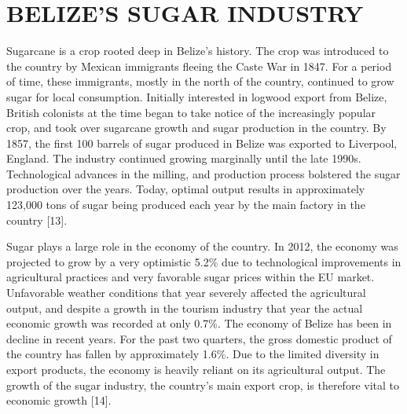 \documentclass[twocolumn,10pt]{asme2e}
\begin{document}
\section*{BELIZE'S SUGAR INDUSTRY}
Sugarcane is a crop rooted deep in Belize's history. The crop was introduced to the country by Mexican immigrants fleeing the Caste War in 1847. For a period of time, these immigrants, mostly in the north of the country, continued to grow sugar for local consumption. Initially interested in logwood export from Belize, British colonists at the time began to take notice of the increasingly popular crop, and took over sugarcane growth and sugar production in the country. By 1857, the first 100 barrels of sugar produced in Belize was exported to Liverpool, England. The industry continued growing marginally until the late 1990s. Technological advances in the milling, and production process bolstered the sugar production over the years. Today, optimal output results in approximately 123,000 tons of sugar being produced each year by the main factory in the country [13]. 


Sugar plays a large role in the economy of the country. In 2012, the economy was projected to grow by a very optimistic 5.2\% due to technological improvements in agricultural practices and very favorable sugar prices within the EU market. Unfavorable weather conditions that year severely affected the agricultural output, and despite a growth in the tourism industry that year the actual economic growth was recorded at only 0.7\%. The economy of Belize has been in decline in recent years. For the past two quarters, the gross domestic product of the country has fallen by approximately 1.6\%. Due to the limited diversity in export products, the economy is heavily reliant on its agricultural output. The growth of the sugar industry, the country's main export crop, is therefore vital to economic growth [14]. 
\end{document}
